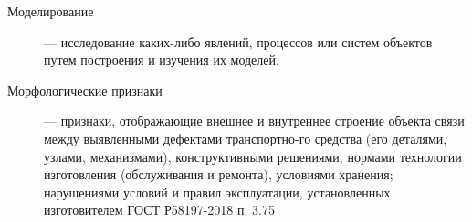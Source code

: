\begin{description}
\item[Моделирование]--- исследование каких-либо явлений, процессов или систем объектов путем построения и изучения их моделей.
\item[Морфологические признаки]--- признаки, отображающие внешнее и внутреннее строение объекта
 связи между выявленными дефектами транспортно-го средства (его деталями, узлами, механизмами), конструктивными решениями, нормами технологии изготовления (обслуживания и ремонта), условиями хранения; нарушениями условий и правил эксплуатации, установленных изготовителем ГОСТ Р58197-2018 п. 3.75


%
%

\end{description}

